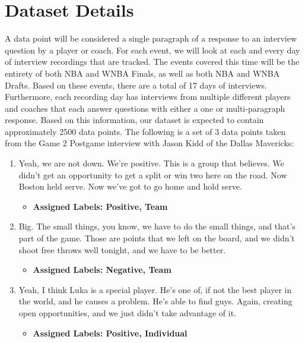\documentclass[titlepage]{article}
\begin{document}
\section{Dataset Details}
\indent A data point will be considered a single paragraph of a response to an interview question by a player or coach. 
For each event, we will look at each and every day of interview recordings that are tracked. The events covered 
this time will be the entirety of both NBA and WNBA Finals, as well as both NBA and WNBA Drafts. Based on these 
events, there are a total of 17 days of interviews. Furthermore, each recording day has interviews from multiple 
different players and coaches that each answer questions with either a one or multi-paragraph response. Based on 
this information, our dataset is expected to contain approximately 2500 data points.
\newline \newline
\indent The following is a set of 3 data points taken from the Game 2 Postgame interview with Jason Kidd of the Dallas 
Mavericks:
\begin{enumerate}
    \item Yeah, we are not down. We're positive. This is a group that believes. We didn't get an opportunity to get a 
    split or win two here on the road. Now Boston held serve. Now we've got to go home and hold serve.
    \begin{itemize}
        \item \textbf{Assigned Labels: Positive, Team}
    \end{itemize}

    \item Big. The small things, you know, we have to do the small things, and that's part of the game. Those are points 
    that we left on the board, and we didn't shoot free throws well tonight, and we have to be better.
    \begin{itemize}
        \item \textbf{Assigned Labels: Negative, Team}
    \end{itemize}

    \item Yeah, I think Luka is a special player. He's one of, if not the best player in the world, and he causes a problem. 
    He's able to find guys. Again, creating open opportunities, and we just didn't take advantage of it.
    \begin{itemize}
        \item \textbf{Assigned Labels: Positive, Individual}
    \end{itemize}
\end{enumerate}
\end{document}
